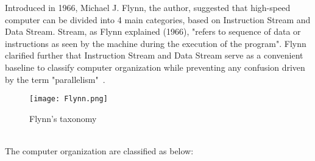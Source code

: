 Introduced in 1966, Michael J. Flynn, the author, suggested that high-speed computer can be divided into 4 main categories, based on Instruction Stream and Data Stream. Stream, as Flynn explained (1966), "refers to sequence of data or instructions as seen by the machine during the execution of the program". Flynn clarified further that Instruction Stream and Data Stream serve as a convenient baseline to classify computer organization while preventing any confusion driven by the term "parallelism"~\cite{flynn}. \\
\begin{figure}[H]
\texttt{[image: Flynn.png]}
\centering
\caption{Flynn's taxonomy}
\end{figure}
~\\
The computer organization are classified as below:

